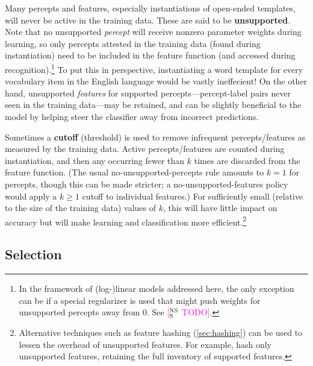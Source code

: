 \documentclass[11pt,letterpaper]{article}
\makeatletter
\newcommand{\ensuretext}[1]{#1}
\newcommand{\nssmarker}{\ensuretext{\textcolor{magenta}{\ensuremath{^{\textsc{NS}}_{\textsc{S}}}}}}
\newcommand{\arkcomment}[3]{\ensuretext{\textcolor{#3}{[#1 #2]}}}
\newcommand{\nss}[1]{\arkcomment{\nssmarker}{#1}{magenta}}
\renewcommand{\paragraph}{%
  \@startsection{paragraph}{4}%
  {\z@}{.2ex \@plus 1ex \@minus .2ex}{-1em}%
  {\normalfont\normalsize\bfseries}%
}
\makeatother
\begin{document}
Many percepts and features, especially instantiations of open-ended templates, will never be active in the training data. 
These are said to be \textbf{unsupported}.
Note that no unsupported {\em percept} will receive nonzero parameter weights during learning, 
so only percepts attested in the training data (found during instantiation) 
need to be included in the feature function (and accessed during recognition).\footnote{In the framework of \mbox{(log-)linear} 
models addressed here, the only exception can be if a special regularizer is used that might push weights for unsupported percepts away from 0. 
See \nss{TODO}.}
To put this in perspective, instantiating a word template for every vocabulary item in the English language would be vastly ineffecient!
On the other hand, unsupported {\em features} for supported percepts---percept-label pairs never seen in the training data---may be retained, 
and can be slightly beneficial to the model by helping steer the classifier away from incorrect predictions. 

Sometimes a \textbf{cutoff} (threshold) is used to remove infrequent percepts\slash features as measured by the training data.
Active percepts\slash features are counted during instantiation, and then any occurring fewer than $k$ times 
are discarded from the feature function. (The usual no-unsupported-percepts rule amounts to $k=1$ for percepts, 
though this can be made stricter; a no-unsupported-features policy would apply a $k\geq 1$ cutoff to individual features.)
For sufficiently small (relative to the size of the training data) values of $k$, 
this will have little impact on accuracy but will make learning and classification more efficient.\footnote{\label{fn:hall-14}%
Alternative techniques such as feature hashing (\cref{sec:hashing}) can be used to lessen the overhead of unsupported features. 
For example, \citet{hall-14} hash only unsupported features, retaining the full inventory of supported features.}

\subsection{Selection}\label{sec:selection}
\end{document}
